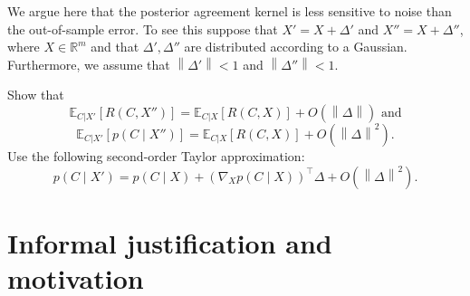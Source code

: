 We argue here that the posterior agreement kernel is less sensitive to noise than the out-of-sample error. To see this suppose that $X' = X + \Delta'$ and $X'' = X + \Delta''$, where $X \in \mathbb{R}^m$ and that $\Delta', \Delta''$ are distributed according to a Gaussian. Furthermore, we assume that $\left\|\Delta'\right\| < 1$ and $\left\|\Delta''\right\| < 1$. 

\begin{exercise} Show that
%
\begin{equation}
\mathbb{E}_{C | X'}[R(C, X'')] = \mathbb{E}_{C | X}[R(C, X)] + O(\left\|\Delta\right\|) \text{ and}
\end{equation}
%
\begin{equation}
\mathbb{E}_{C | X'}[p(C \mid X'')] = \mathbb{E}_{C | X}[R(C, X)] + O(\left\|\Delta\right\|^2).
\end{equation}
%
Use the following second-order Taylor approximation:
%
\begin{equation}
p(C \mid X') = p(C \mid X) + \left(\nabla_{X}p(C\mid X)\right)^\top \Delta + O(\left\|\Delta\right\|^2).
\end{equation}
%
\end{exercise}
%

%



%


\section{Informal justification and motivation}
\label{sec:inf_justification}



